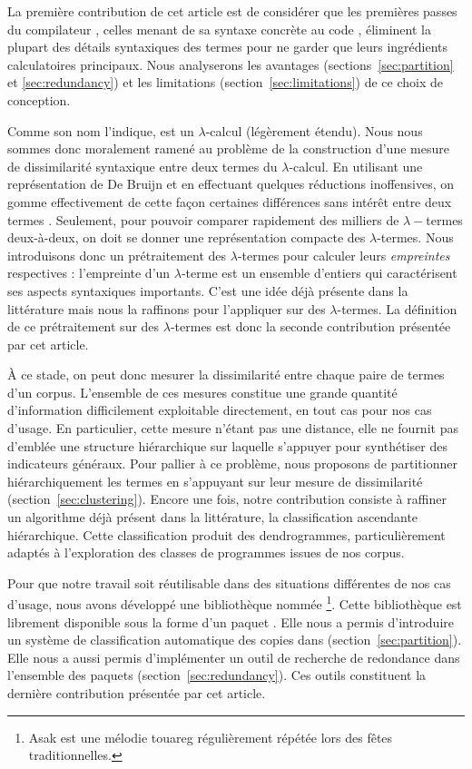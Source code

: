 La première contribution de cet article est de considérer que les
premières passes du compilateur {\OCaml}, celles menant de sa syntaxe
concrète au code {\LambdaCode}, éliminent la plupart des détails
syntaxiques des termes {\OCaml} pour ne garder que leurs ingrédients
calculatoires principaux. Nous analyserons les avantages
(sections~\ref{sec:partition} et \ref{sec:redundancy}) et les
limitations (section~\ref{sec:limitations}) de ce choix de conception.

Comme son nom l'indique, {\LambdaCode} est un $\lambda$-calcul
(légèrement étendu). Nous nous sommes donc moralement ramené au
problème de la construction d'une mesure de dissimilarité syntaxique
entre deux termes du $\lambda$-calcul. En utilisant une représentation
de De Bruijn et en effectuant quelques réductions inoffensives, on
gomme effectivement de cette façon certaines différences sans intérêt
entre deux termes {\OCaml}. Seulement, pour pouvoir comparer
rapidement des milliers de $\lambda-$termes deux-à-deux, on doit se
donner une représentation compacte des $\lambda$-termes. Nous
introduisons donc un prétraitement des $\lambda$-termes pour calculer
leurs \textit{empreintes} respectives : l'empreinte d'un
$\lambda$-terme est un ensemble d'entiers qui caractérisent ses
aspects syntaxiques importants. C'est une idée déjà présente dans la
littérature mais nous la raffinons pour l'appliquer sur des
$\lambda$-termes.  La définition de ce prétraitement sur des
$\lambda$-termes est donc la seconde contribution présentée par cet
article.

À ce stade, on peut donc mesurer la dissimilarité entre chaque paire de termes
d'un corpus. L'ensemble de ces mesures constitue une grande quantité
d'information difficilement exploitable directement, en tout cas pour
nos cas d'usage. En particulier, cette mesure n'étant pas une
distance, elle ne fournit pas d'emblée une structure hiérarchique sur
laquelle s'appuyer pour synthétiser des indicateurs généraux. Pour
pallier à ce problème, nous proposons de partitionner hiérarchiquement
les termes en s'appuyant sur leur mesure de dissimilarité
(section~\ref{sec:clustering}). Encore une fois, notre contribution
consiste à raffiner un algorithme déjà présent dans la littérature, la
classification ascendante hiérarchique. Cette classification produit
des dendrogrammes, particulièrement adaptés à l'exploration des
classes de programmes issues de nos corpus.

Pour que notre travail soit réutilisable dans des situations
différentes de nos cas d'usage, nous avons développé une bibliothèque
nommée {\Asak}\footnote{Asak est une mélodie touareg régulièrement répétée
lors des fêtes traditionnelles. }.
Cette bibliothèque est librement disponible sous la forme d'un paquet {\Opam}.
Elle nous a permis d'introduire un système de classification automatique
des copies dans {\LearnOCaml} (section~\ref{sec:partition}). Elle nous a
aussi permis d'implémenter un outil de recherche de redondance dans
l'ensemble des paquets {\Opam} (section~\ref{sec:redundancy}). Ces outils
constituent la dernière contribution présentée par cet article.
